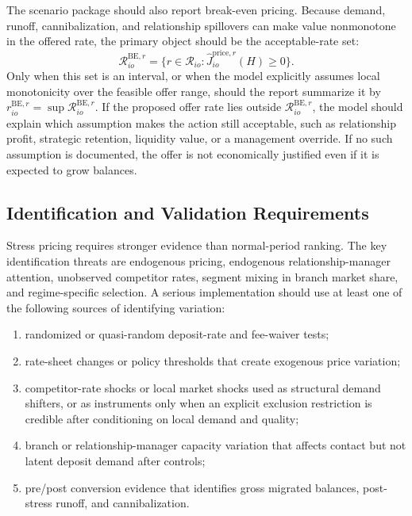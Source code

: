 \documentclass[11pt]{article}
\begin{document}
The scenario package should also report break-even pricing. Because demand,
runoff, cannibalization, and relationship spillovers can make value nonmonotone
in the offered rate, the primary object should be the acceptable-rate set:
\[
  \mathcal{R}_{io}^{\mathrm{BE},r}
  =
  \{r\in\mathcal{R}_{io}:
  \widehat{J}_{io}^{\mathrm{price},r}(H)\ge 0\}.
\]
Only when this set is an interval, or when the model explicitly assumes local
monotonicity over the feasible offer range, should the report summarize it by
$r_{io}^{\mathrm{BE},r}=\sup \mathcal{R}_{io}^{\mathrm{BE},r}$. If the proposed
offer rate lies outside $\mathcal{R}_{io}^{\mathrm{BE},r}$, the model should
explain which assumption makes the action still acceptable, such as
relationship profit, strategic retention, liquidity value, or a management
override. If no such assumption is documented, the offer is not economically
justified even if it is expected to grow balances.

\subsection{Identification and Validation Requirements}

Stress pricing requires stronger evidence than normal-period ranking. The key
identification threats are endogenous pricing, endogenous relationship-manager
attention, unobserved competitor rates, segment mixing in branch market share,
and regime-specific selection. A serious implementation should use at least one
of the following sources of identifying variation:

\begin{enumerate}[leftmargin=*]
  \item randomized or quasi-random deposit-rate and fee-waiver tests;
  \item rate-sheet changes or policy thresholds that create exogenous price
  variation;
  \item competitor-rate shocks or local market shocks used as structural demand
  shifters, or as instruments only when an explicit exclusion restriction is
  credible after conditioning on local demand and quality;
  \item branch or relationship-manager capacity variation that affects contact
  but not latent deposit demand after controls;
  \item pre/post conversion evidence that identifies gross migrated balances,
  post-stress runoff, and cannibalization.
\end{enumerate}
\end{document}
